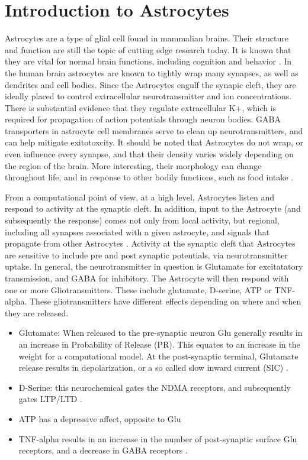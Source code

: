     \section{Introduction to Astrocytes}
    Astrocytes are a type of glial cell found in mammalian brains. Their
    structure and function are still the topic of cutting edge research
    today. It is known that they are vital for normal brain functions, including
    cognition and behavior \cite{mederos_2018}. In the human brain astrocytes
    are known to tightly wrap many synapses, as well as dendrites and cell
    bodies. Since the Astrocytes engulf the synapic cleft, they are ideally
    placed to control extracellular neurotransmitter and ion
    concentrations. There is substantial evidence that they regulate
    extracellular K+, which is required for propagation of action potentials
    through neuron bodies. GABA transporters in astrocyte cell membranes serve
    to clean up neurotransmitters, and can help mitigate exitotoxcity. It should
    be noted that Astrocytes do not wrap, or even influence every synapse, and
    that their density varies widely depending on the region of the brain. More
    interesting, their morphology can change throughout life, and in response to
    other bodily functions, such as food intake \cite{mederos_2018}.

    From a computational point of view, at a high level, Astrocytes listen and
    respond to activity at the synaptic cleft. In addition, input to the
    Astrocyte (and subsequently the response) comes not only from local
    activity, but regional, including all synapses associated with a given
    astrocyte, and signals that propagate from other Astrocytes
    \cite{min_2012}. Activity at the synaptic cleft that Astrocytes are
    sensitive to include pre and post synaptic potentials, via neurotransmitter
    uptake. In general, the neurotransmitter in question is Glutamate for
    excitatatory transmission, and GABA for inhibitory. The Astrocyte will then
    respond with one or more Gliotransmitters. These include glutamate,
    D-serine, ATP or TNF-alpha. These gliotransmitters have different effects
    depending on where and when they are released.
    \begin{itemize}
      \item Glutamate: When released to the pre-synaptic neuron Glu generally
        results in an increase in Probability of Release (PR). This equates to
        an increase in the weight for a computational model. At the
        post-synaptic terminal, Glutamate release results in depolarization, or
        a so called slow inward current (SIC) \cite{pitta_2016}.
      \item D-Serine: this neurochemical gates the NDMA receptors, and
        subsequently gates LTP/LTD \cite{mederos_2018}.
      \item ATP has a depressive affect, opposite to Glu \cite{mederos_2018}
      \item TNF-alpha results in an increase in the number of post-synaptic
        surface Glu receptors, and a decrease in GABA receptors
        \cite{chung_2015}.
    \end{itemize}

